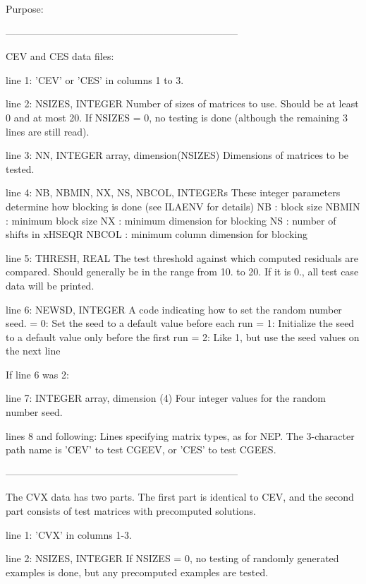 \begin{DoxyParagraph}{Purpose\+: }
\begin{DoxyVerb}
-----------------------------------------------------------------------

 CEV and CES data files:

 line 1:  'CEV' or 'CES' in columns 1 to 3.

 line 2:  NSIZES, INTEGER
          Number of sizes of matrices to use. Should be at least 0
          and at most 20. If NSIZES = 0, no testing is done
          (although the remaining  3 lines are still read).

 line 3:  NN, INTEGER array, dimension(NSIZES)
          Dimensions of matrices to be tested.

 line 4:  NB, NBMIN, NX, NS, NBCOL, INTEGERs
          These integer parameters determine how blocking is done
          (see ILAENV for details)
          NB     : block size
          NBMIN  : minimum block size
          NX     : minimum dimension for blocking
          NS     : number of shifts in xHSEQR
          NBCOL  : minimum column dimension for blocking

 line 5:  THRESH, REAL
          The test threshold against which computed residuals are
          compared. Should generally be in the range from 10. to 20.
          If it is 0., all test case data will be printed.

 line 6:  NEWSD, INTEGER
          A code indicating how to set the random number seed.
          = 0:  Set the seed to a default value before each run
          = 1:  Initialize the seed to a default value only before the
                first run
          = 2:  Like 1, but use the seed values on the next line

 If line 6 was 2:

 line 7:  INTEGER array, dimension (4)
          Four integer values for the random number seed.

 lines 8 and following:  Lines specifying matrix types, as for NEP.
          The 3-character path name is 'CEV' to test CGEEV, or
          'CES' to test CGEES.

-----------------------------------------------------------------------

 The CVX data has two parts. The first part is identical to CEV,
 and the second part consists of test matrices with precomputed
 solutions.

 line 1:  'CVX' in columns 1-3.

 line 2:  NSIZES, INTEGER
          If NSIZES = 0, no testing of randomly generated examples
          is done, but any precomputed examples are tested.


\end{DoxyVerb}
\end{DoxyParagraph}
